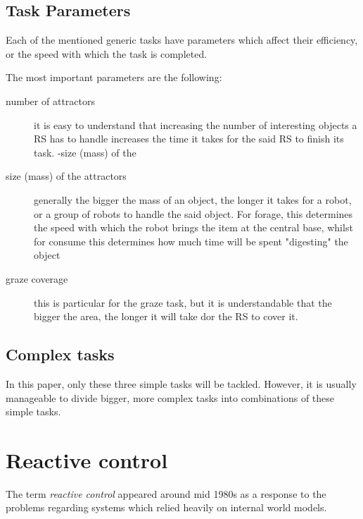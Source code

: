 \documentclass[12pt]{report}
\begin{document}
\section{Task Parameters}

Each of the mentioned generic tasks have parameters which affect their efficiency, or the speed with which the task is completed.

The most important parameters are the following:

\begin{description}

\item [number of attractors] it is easy to understand that increasing the number of interesting objects a RS has to handle increases the time it takes for the said RS to finish its task.
-size (mass) of the 

\item [size (mass) of the attractors] generally the bigger the mass of an object, the longer it takes for a robot, or a group of robots to handle the said object. For forage, this determines the speed with which the robot brings  the item at the central base, whilst for consume this determines how much time will be spent "digesting" the object


\item [graze coverage] this is particular for the graze task, but it is understandable that the bigger the area, the longer it will take dor the RS to cover it.

\end{description}







\section{Complex tasks}

In this paper, only these three simple tasks will be tackled. However, it is usually manageable to divide bigger, more complex tasks into combinations of these simple tasks.




\chapter{Reactive control}

The term \emph{reactive control} appeared around mid 1980s as a response to the problems regarding systems which relied heavily on internal world models. 
\end{document}

